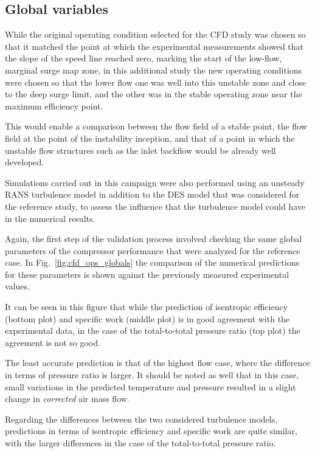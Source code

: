 \subsection{Global variables}

While the original operating condition selected for the CFD study was chosen so that it matched the point at which the experimental measurements showed that the slope of the speed line reached zero, marking the start of the low-flow, marginal surge map zone, in this additional study the new operating conditions were chosen so that the lower flow one was well into this unstable zone and close to the deep surge limit, and the other was in the stable operating zone near the maximum efficiency point.

This would enable a comparison between the flow field of a stable point, the flow field at the point of the instability inception, and that of a point in which the unstable flow structures such as the inlet backflow would be already well developed. 

Simulations carried out in this campaign were also performed using an unsteady RANS turbulence model in addition to the DES model that was considered for the reference study, to assess the influence that the turbulence model could have in the numerical results.

Again, the first step of the validation process involved checking the same global parameters of the compressor performance that were analyzed for the reference case. In Fig.~\ref{fig:cfd_ops_globals} the comparison of the numerical predictions for these parameters is shown against the previously measured experimental values.  

It can be seen in this figure that while the prediction of isentropic efficiency (bottom plot) and specific work (middle plot) is in good agreement with the experimental data, in the case of the total-to-total pressure ratio (top plot) the agreement is not so good.

The least accurate prediction is that of the highest flow case, where the difference in terms of pressure ratio is larger. It should be noted as well that in this case, small variations in the predicted temperature and pressure resulted in a slight change in \textit{corrected} air mass flow.

Regarding the differences between the two considered turbulence models, predictions in terms of isentropic efficiency and specific work are quite similar, with the larger differences in the case of the total-to-total pressure ratio. 

